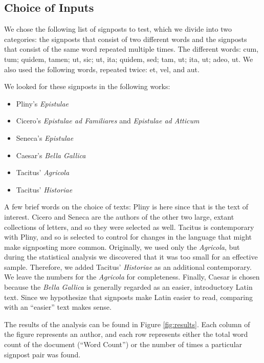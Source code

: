 \subsection{Choice of Inputs}

We chose the following list of signposts to test, which we divide into two categories: the signposts that consist of two different words and the signposts that consist of the same word repeated multiple times. The different words: cum, tum; quidem, tamen; ut, sic; ut, ita; quidem, sed; tam, ut; ita, ut; adeo, ut. We also used the following words, repeated twice: et, vel, and aut.

We looked for these signposts in the following works:
\begin{itemize}
  \item Pliny's \textit{Epistulae}
  \item Cicero's \textit{Epistulae ad Familiares} and \textit{Epistulae ad Atticum}
  \item Seneca's \textit{Epistulae}
  \item Caesar's \textit{Bella Gallica}
  \item Tacitus' \textit{Agricola}
  \item Tacitus' \textit{Historiae}
\end{itemize}

A few brief words on the choice of texts: Pliny is here since that is the text of interest. Cicero and Seneca are the authors of the other two large, extant collections of letters, and so they were selected as well. Tacitus is contemporary with Pliny, and so is selected to control for changes in the language that might make signposting more common. Originally, we used only the \textit{Agricola}, but during the statistical analysis we discovered that it was too small for an effective sample. Therefore, we added Tacitus' \textit{Historiae} as an additional contemporary. We leave the numbers for the \textit{Agricola} for completeness. Finally, Caesar is chosen because the \textit{Bella Gallica} is generally regarded as an easier, introductory Latin text. Since we hypothesize that signposts make Latin easier to read, comparing with an ``easier'' text makes sense.

The results of the analysis can be found in Figure \ref{fig:results}. Each column of the figure represents an author, and each row represents either the total word count of the document (``Word Count'') or the number of times a particular signpost pair was found.

